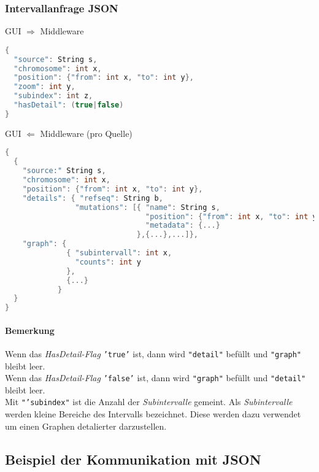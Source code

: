 \subsubsection{Intervallanfrage JSON}
GUI $\Rightarrow$ Middleware
\begin{lstlisting}[language=c,
commentstyle=\fontsize{12}{14.4}\selectfont,
basicstyle=\ttfamily\fontsize{10}{12}\selectfont, showstringspaces=false]
{
  "source": String s,
  "chromosome": int x,
  "position": {"from": int x, "to": int y},
  "zoom": int y,
  "subindex": int z,
  "hasDetail": (true|false)
}
\end{lstlisting}
GUI $\Leftarrow$ Middleware (pro Quelle)
\begin{lstlisting}[language=c,
commentstyle=\fontsize{12}{14.4}\selectfont,
basicstyle=\ttfamily\fontsize{10}{12}\selectfont, showstringspaces=false]
{
  {
    "source:" String s,
    "chromosome": int x,
    "position": {"from": int x, "to": int y},
    "details": { "refseq": String b,
                "mutations": [{ "name": String s,
                                "position": {"from": int x, "to": int y},
                                "metadata": {...}
                              },{...},...]},
    "graph": {
              { "subintervall": int x,
                "counts": int y
              },
              {...}
            }
  }
}
\end{lstlisting}
\paragraph{Bemerkung} Wenn das \textit{HasDetail-Flag} \texttt{'true'} ist, dann wird \texttt{"detail"} befüllt und \texttt{"graph"} bleibt leer.\\
Wenn das \textit{HasDetail-Flag} \texttt{'false'} ist, dann wird \texttt{"graph"} befüllt und \texttt{"detail"} bleibt leer.\\
Mit \texttt{"'subindex"} ist die Anzahl der \textit{Subintervalle} gemeint. Als \textit{Subintervalle} werden kleine Bereiche des Intervalls bezeichnet. Diese werden dazu verwendet um einen Graphen detalierter darzustellen.
\newpage
\subsection{Beispiel der Kommunikation mit JSON}
